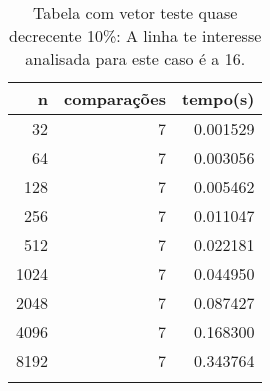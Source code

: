 \begin{table}[ht]
\centering
\begin{tabular}{rrr} \toprule
        n &    comparações &       tempo(s) \\ \midrule
      32  &              7 &      0.001529 \\
      64  &              7 &      0.003056 \\
     128  &              7 &      0.005462 \\
     256  &              7 &      0.011047 \\
     512  &              7 &      0.022181 \\
    1024  &              7 &      0.044950 \\
    2048  &              7 &      0.087427 \\
    4096  &              7 &      0.168300 \\
    8192  &              7 &      0.343764 \\
\bottomrule\addlinespace
\end{tabular}
\caption{Tabela com vetor teste quase decrecente 10\%: A linha te interesse analisada para este caso é a 16.}
\label{tab:radixsortQuaseDecresc10}
\end{table}
